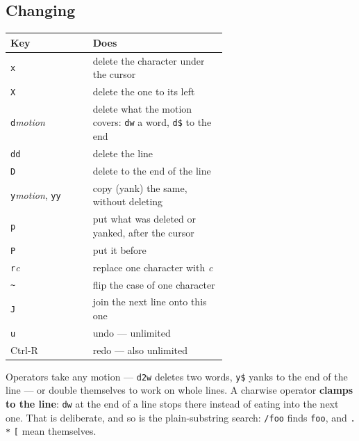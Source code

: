 \subsection*{Changing}
\begin{center}
\small
\begin{tabular}{@{}l >{\raggedright\arraybackslash}p{0.62\linewidth}@{}}
\toprule
\textbf{Key} & \textbf{Does} \\
\midrule
\texttt{x} & delete the character under the cursor \\
\texttt{X} & delete the one to its left \\
\texttt{d}\emph{motion} & delete what the motion covers: \texttt{dw} a word, \texttt{d\$} to the end \\
\texttt{dd} & delete the line \\
\texttt{D} & delete to the end of the line \\
\texttt{y}\emph{motion}, \texttt{yy} & copy (yank) the same, without deleting \\
\texttt{p} & put what was deleted or yanked, after the cursor \\
\texttt{P} & put it before \\
\texttt{r}\emph{c} & replace one character with \emph{c} \\
\texttt{\textasciitilde} & flip the case of one character \\
\texttt{J} & join the next line onto this one \\
\texttt{u} & undo --- unlimited \\
Ctrl-R & redo --- also unlimited \\
\bottomrule
\end{tabular}
\end{center}

Operators take any motion --- \verb|d2w| deletes two words, \verb|y$| yanks
to the end of the line --- or double themselves to work on whole lines.
A charwise operator \textbf{clamps to the line}: \verb|dw| at the end of
a line stops there instead of eating into the next one. That is
deliberate, and so is the plain-substring search: \verb|/foo| finds
\verb|foo|, and \verb|.| \verb|*| \verb|[| mean themselves.

